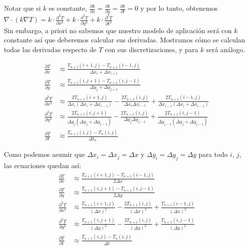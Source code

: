 \documentclass[a4paper]{article}
\begin{document}
Notar que si $k$ es constante, $\frac{\partial k}{\partial x} = \frac{\partial k}{\partial y} = \frac{\partial k}{\partial t} = 0$ y por lo tanto, obtenemos $\nabla \cdot (k \nabla T) = k \cdot \frac{\partial^2 T}{\partial x^2} + k \cdot \frac{\partial^2 T}{\partial y^2} + k \cdot \frac{\partial^2 T}{\partial t^2}$ \\
Sin embargo, a priori no sabemos que nuestro modelo de aplicación será con $k$ constante así que deberemos calcular sus derivadas. Mostramos cómo se calculan todas las derivadas respecto de $T$ con sus discretizaciones, y para $k$ será análogo.

\begin{equation*}
\begin{split}
\frac{\partial T}{\partial x} & \approx \frac{T_{n+1}(i+1,j) - T_{n+1}(i-1,j)}{\Delta x_i + \Delta x_{i+1}} \\
\frac{\partial T}{\partial y} & \approx \frac{T_{n+1}(i,j+1) - T_{n+1}(i,j-1)}{\Delta y_j + \Delta y_{j+1}} \\
\frac{\partial^2 T}{\partial x^2} & \approx \frac{2 T_{n+1}(i+1,j)}{\Delta x_i (\Delta x_i + \Delta x_{i-1})} - \frac{2 T_{n+1}(i,j)}{\Delta x_i \Delta x_{i-1}} + \frac{2 T_{n+1}(i-1,j)}{\Delta x_{i-1} (\Delta x_i + \Delta x_{i-1})} \\
\frac{\partial^2 T}{\partial y^2} & \approx \frac{2 T_{n+1}(i,j+1)}{\Delta y_j (\Delta y_j + \Delta y_{j-1})} - \frac{2 T_{n+1}(i,j)}{\Delta y_j \Delta y_{j-1}} + \frac{2 T_{n+1}(i,j-1)}{\Delta y_{j-1} (\Delta y_j + \Delta y_{j-1})} \\
\frac{\partial T}{\partial t} & \approx \frac{T_{n+1}(i,j) - T_n(i,j)}{\Delta t_n}
\end{split}
\end{equation*}

Como podemos asumir que $\Delta x_i = \Delta x_j = \Delta x$ y $\Delta y_i = \Delta y_j = \Delta y$ para todo $i$, $j$, las ecuaciones quedan así:
\begin{equation} \label{eq:derivadas}
\begin{split}
\frac{\partial T}{\partial x} & \approx \frac{T_{n+1}(i+1,j) - T_{n+1}(i-1,j)}{2\Delta x}  \\
\frac{\partial T}{\partial y} & \approx \frac{T_{n+1}(i,j+1) - T_{n+1}(i,j-1)}{2\Delta y} \\
\frac{\partial^2 T}{\partial x^2} & \approx \frac{T_{n+1}(i+1,j)}{(\Delta x)^2} - \frac{2 T_{n+1}(i,j)}{(\Delta x)^2} + \frac{T_{n+1}(i-1,j)}{(\Delta x)^2} \\
\frac{\partial^2 T}{\partial y^2} & \approx \frac{T_{n+1}(i,j+1)}{(\Delta y)^2} - \frac{2 T_{n+1}(i,j)}{(\Delta y)^2} + \frac{T_{n+1}(i,j-1)}{(\Delta y)^2} \\
\frac{\partial T}{\partial t} & \approx \frac{T_{n+1}(i,j) - T_n(i,j)}{\Delta t}
\end{split}
\end{equation}
\end{document}
